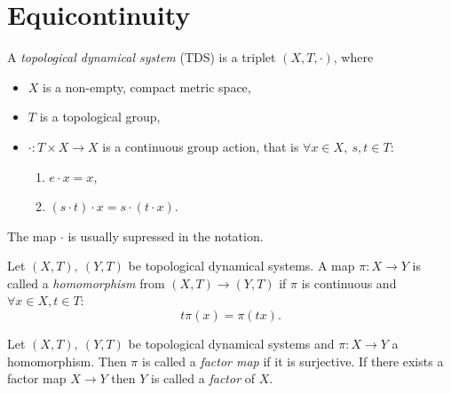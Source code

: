\section{Equicontinuity}

\begin{definition}
	A \emph{topological dynamical system} (TDS) is a triplet $(X,T,\cdot)$, where
	\begin{itemize}
		\item $X$ is a non-empty, compact metric space,
		\item $T$ is a topological group,
		\item $\cdot : T \times  X \to X$ is a continuous group action, that is $\forall x \in X, \ s,t \in T$: 
		\begin{enumerate}
			\item $ e \cdot x = x$,
			\item $(s \cdot t)\cdot x = s \cdot (t \cdot x)$.
		\end{enumerate}
	\end{itemize}
\end{definition}
\begin{remark}
	The map $\cdot$ is usually supressed in the notation.
\end{remark}

\begin{definition}
	Let $(X,T), \ (Y,T)$ be topological dynamical systems.
	A map $\pi : X \to Y$ is called a \emph{homomorphism} from $(X,T) \to (Y,T)$ if $\pi$ is continuous and $\forall x \in X, t \in T$:
	\begin{equation*}
		t \pi (x) = \pi (t x).
	\end{equation*}
\end{definition}

\begin{definition}
	Let $(X,T), \ (Y,T)$ be topological dynamical systems and $\pi: X \to Y$ a homomorphism.
	Then $\pi$ is called a \emph{factor map} if it is surjective.
	If there exists a factor map $X \to Y$ then $Y$ is called a \emph{factor} of $X$.
\end{definition}

